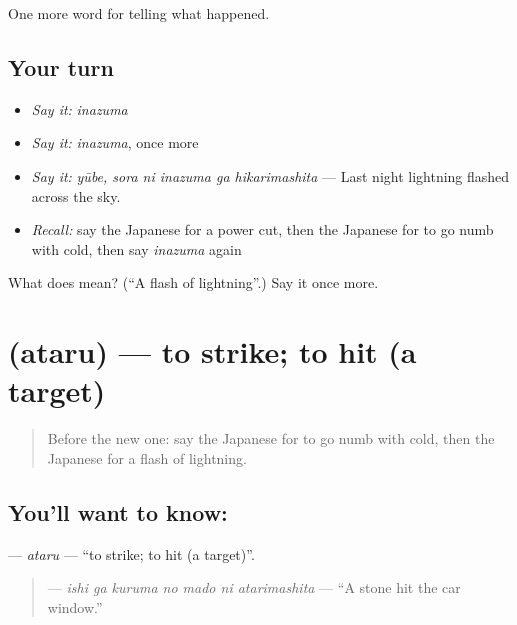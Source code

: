 \begin{grammarlens}[title={What you've built}]
One more word for telling what happened.
\end{grammarlens}

\subsection*{Your turn}
\begin{itemize}
\raggedright
  \item \emph{Say it:} \emph{inazuma}
  \item \emph{Say it:} \emph{inazuma}, once more
  \item \emph{Say it:} \emph{yūbe, sora ni inazuma ga hikarimashita} — Last night lightning flashed across the sky.
  \item \emph{Recall:} say the Japanese for a power cut, then the Japanese for to go numb with cold, then say \emph{inazuma} again
\end{itemize}

\begin{tcolorbox}[breakable,colback=teal!4,colframe=teal!35!black,title={Before you move on}]
What does  mean? (\textquotedblleft{}A flash of lightning\textquotedblright{}.) Say it once more.
\end{tcolorbox}
\section[\texorpdfstring{\ja{あたる} (ataru)}{あたる (ataru)}]{ (ataru) — to strike; to hit (a target)}

\label{lesson:JA-C278-ataru}



\begin{quote}
Before the new one: say the Japanese for to go numb with cold, then the Japanese for a flash of lightning.
\end{quote}

\subsection*{You'll want to know: }
\textbf{} — \emph{ataru} — \textquotedblleft{}to strike; to hit (a target)\textquotedblright{}.

\begin{quote}
\textbf{   } — \emph{ishi ga kuruma no mado ni atarimashita} — \textquotedblleft{}A stone hit the car window.\textquotedblright{}
\end{quote}


